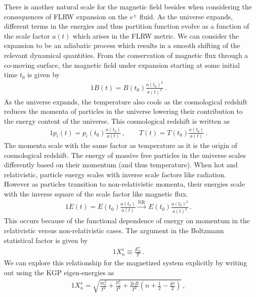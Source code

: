 There is another natural scale for the magnetic field besides  when considering the consequences of FLRW expansion on the $e^{\pm}$ fluid. As the universe expands, different terms in the energies and thus partition function evolve as a function of the scale factor $a(t)$ which arises in the FLRW metric. We can consider the expansion to be an adiabatic process which results in a smooth shifting of the relevant dynamical quantities. From the conservation of magnetic flux through a co-moving surface, the magnetic field under expansion starting at some initial time $t_{0}$ is given by
\begin{alignat}{1}
    \label{BScale} B(t) = B(t_{0})\frac{a(t_{0})^{2}}{a(t)^{2}}\,.
\end{alignat}
As the universe expands, the temperature also cools as the cosmological redshift reduces the momenta of particles in the universe lowering their contribution to the energy content of the universe. This cosmological redshift is written as
\begin{alignat}{1}
  \label{Redshift} p_{i}(t) = p_{i}(t_{0})\frac{a(t_{0})}{a(t)}\,,\qquad T(t) = T(t_{0})\frac{a(t_{0})}{a(t)}\,.
\end{alignat}
The momenta scale with the same factor as temperature as it is the origin of cosmological redshift. The energy of massive free particles in the universe scales differently based on their momentum (and thus temperature). When hot and relativistic, particle energy scales with inverse scale factors like radiation. However as particles transition to non-relativistic momenta, their energies scale with the inverse square of the scale factor like magnetic flux.
\begin{alignat}{1}
    \label{EScale} E(t) = E(t_{0})\frac{a(t_{0})}{a(t)}\xrightarrow{\mathrm{NR}}\  E(t_{0})\frac{a(t_{0})^{2}}{a(t)^{2}}\,.
\end{alignat}
This occurs because of the functional dependence of energy on momentum in the relativistic versus non-relativistic cases. The argument in the Boltzmann statistical factor is given by
\begin{alignat}{1}
    \label{Boltz} X_{n}^{s}\equiv\frac{E_{n}^{s}}{T}\,.
\end{alignat}
We can explore this relationship for the magnetized system explicitly by writing out  using the KGP eigen-energies as
\begin{alignat}{1}
    \label{XExplicit} X_{n}^{s} = \sqrt{\frac{m_{e}^{2}}{T^{2}}+\frac{p_{z}^{2}}{T^{2}}+\frac{2eB}{T^{2}}\left(n+\frac{1}{2}-\frac{gs}{2}\right)}\,,
\end{alignat}
